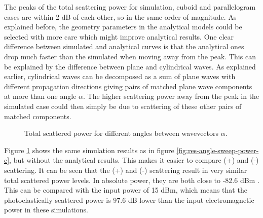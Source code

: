 \documentclass[11pt,twoside]{eitExjobb}
\begin{document}
	The peaks of the total scattering power for simulation, cuboid and parallelogram cases are within 2 dB of each other, so in the same order of magnitude. As explained before, the geometry parameters in the analytical models could be selected with more care which might improve analytical results. One clear difference between simulated and analytical curves is that the analytical ones drop much faster than the simulated when moving away from the peak. This can be explained by the difference between plane and cylindrical waves. As explained earlier, cylindrical waves can be decomposed as a sum of plane waves with different propagation directions giving pairs of matched plane wave components at more than one angle $\alpha$. The higher scattering power away from the peak in the simulated case could then simply be due to scattering of these other pairs of matched components.
	
	\begin{figure}[H]
		\centering
		\begin{subfigure}{\textwidth}
			\resizebox{\textwidth}{!}{
				
			}
		\end{subfigure}
		\begin{subfigure}{\textwidth}
			\resizebox{\textwidth}{!}{
				
			}
		\end{subfigure}
		\caption{\label{fig:res-angle-sweep-power} Total scattered power for different angles between wavevectors $\alpha$.}
	\end{figure}
	
	
	Figure \ref{fig:res-angle-sweep-power} shows the same simulation results as in figure \ref{fig:res-angle-sweep-power-c}, but without the analytical results. This makes it easier to compare (+) and (-) scattering.	It can be seen that the (+) and (-) scattering result in very similar total scattered power levels. In absolute power, they are both close to -82.6 dBm . This can be compared with the input power of 15 dBm, which means that the photoelastically scattered power is 97.6 dB lower than the input electromagnetic power in these simulations.
	
\end{document}
